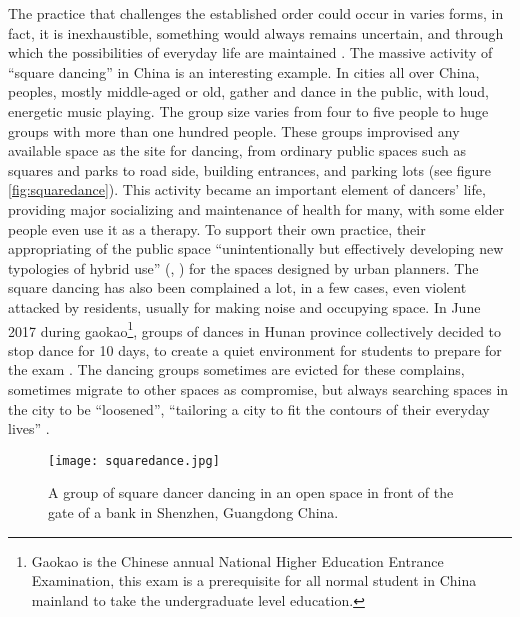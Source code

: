 The practice that challenges the established order could occur in varies forms, in fact, it is inexhaustible, something would always remains uncertain, and through which the possibilities of everyday life are maintained \citep{lefebvre_critique_1991}. The massive activity of ``square dancing'' in China is an interesting example. In cities all over China, peoples, mostly middle-aged or old, gather and dance in the public, with loud, energetic music playing. The group size varies from four to five people to huge groups with more than one hundred people. These groups improvised any available space as the site for dancing, from ordinary public spaces such as squares and parks to road side, building entrances, and parking lots (see figure \vref{fig:squaredance}). This activity became an important element of dancers' life, providing major socializing and maintenance of health for many, with some elder people even use it as a therapy. To support their own practice, their appropriating of the public space ``unintentionally but effectively developing new typologies of hybrid use'' (\citealp{de_certeau_practice_1984}, \citealp[cited in][p.~22]{chen_dancing_2010}) for the spaces designed by urban planners. The square dancing has also been complained a lot, in a few cases, even violent attacked \citep{jacobs_cutting_2015} by residents, usually for making noise and occupying space. In June 2017 during gaokao\footnote{Gaokao is the Chinese annual National Higher Education Entrance Examination, this exam is a prerequisite for all normal student in China mainland to take the undergraduate level education.}, groups of dances in Hunan province collectively decided to stop dance for 10 days, to create a quiet environment for students to prepare for the exam \citep{xinying_squares_2017}. The dancing groups sometimes are evicted for these complains, sometimes migrate to other spaces as compromise, but always searching spaces in the city to be ``loosened'', ``tailoring a city to fit the contours of their everyday lives'' \citep{chen_dancing_2010}.

\begin{figure}[!htbp]
	\centering
	\texttt{[image: squaredance.jpg]}
	\caption[A group of square dancer dancing in an open space in front of the gate of a bank]{A group of square dancer dancing in an open space in front of the gate of a bank in Shenzhen, Guangdong China.}
	\label{fig:squaredance}
\end{figure}

